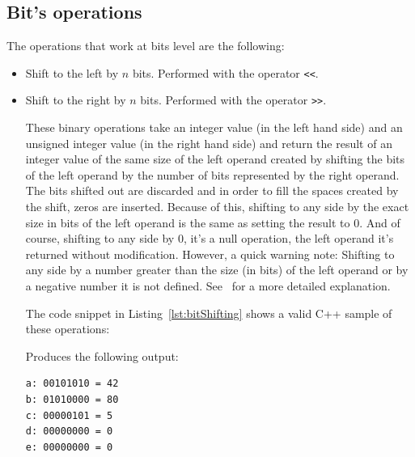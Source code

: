 \subsection{Bit's operations}

The operations that work at bits level are the following:
\begin{itemize}
\item Shift to the left by $n$ bits. Performed with the operator \texttt{<<}.
\item Shift to the right by $n$ bits. Performed with the operator \texttt{>>}.

These binary operations take an integer value (in the left hand side) and an unsigned integer value (in the right hand side) and return the result of an integer value of the same size of the left operand created by shifting the bits of the left operand by the number of bits represented by the right operand.
The bits shifted out are discarded and in order to fill the spaces created by the shift, zeros are inserted.
Because of this, shifting to any side by the exact size in bits of the left operand is the same as setting the result to 0.
And of course, shifting to any side by 0, it's a null operation, the left operand it's returned without modification.
However, a quick warning note: Shifting to any side by a number greater than the size (in bits) of the left operand or by a negative number it is not defined. See~\cite{INT34Cpp} for a more detailed explanation.

The code snippet in Listing~\ref{lst:bitShifting} shows a valid C++ sample of these operations:

{\centering
\begin{minipage}{\linewidth}
\end{minipage}
\par
}

Produces the following output:

\begin{verbatim}
a: 00101010 = 42
b: 01010000 = 80
c: 00000101 = 5
d: 00000000 = 0
e: 00000000 = 0
\end{verbatim} 


\end{itemize}
